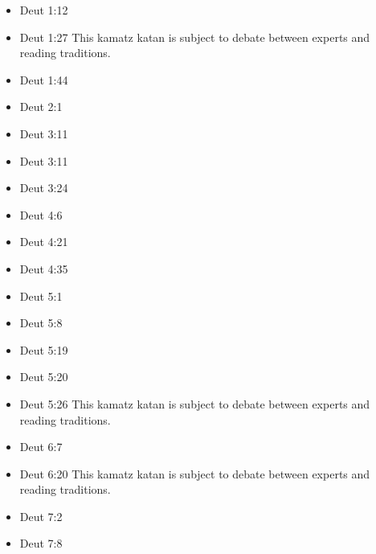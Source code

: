 \documentclass[14pt]{article}
\begin{document}
\begin{multicols}{2}\begin{itemize}
\item Deut 1:12

\item Deut 1:27 This kamatz katan is subject to debate between experts and reading traditions.

\item Deut 1:44

\item Deut 2:1

\item Deut 3:11

\item Deut 3:11

\item Deut 3:24

\item Deut 4:6

\item Deut 4:21

\item Deut 4:35

\item Deut 5:1

\item Deut 5:8

\item Deut 5:19

\item Deut 5:20

\item Deut 5:26 This kamatz katan is subject to debate between experts and reading traditions.

\item Deut 6:7

\item Deut 6:20 This kamatz katan is subject to debate between experts and reading traditions.

\item Deut 7:2

\item Deut 7:8


\end{itemize}
\end{multicols}
\end{document}
